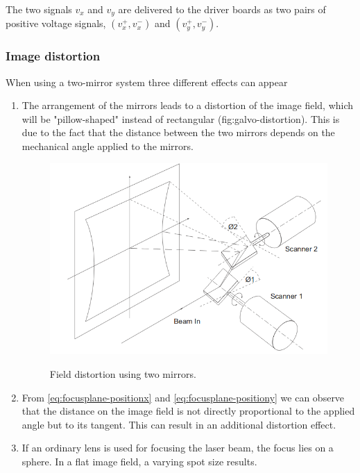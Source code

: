 The two signals $v_x$ and $v_y$ are delivered to the driver boards as two pairs of positive voltage signals, $(v_x^+, v_x^-)$ and $(v_y^+, v_y^-)$. 


\subsubsection{Image distortion}
When using a two-mirror system three different effects can appear
\begin{enumerate}
	\item The arrangement of the mirrors leads to a distortion of the image field, which will be "pillow-shaped" instead of rectangular (fig:galvo-distortion). This is due to the fact that the distance between the two mirrors depends on the mechanical angle applied to the mirrors. 
	
	
	\begin{figure}[bth]
		\myfloatalign
		{\includegraphics[width=0.75\linewidth]{gfx/ch3/galvo-distortion}}
		\caption{Field distortion using two mirrors.}\label{fig:galvo-distortion}
	\end{figure}
	
	
	\item From \autoref{eq:focusplane-positionx} and \autoref{eq:focusplane-positiony} we can observe that the distance on the image field is not directly proportional to the applied angle but to its tangent. This can result in an additional distortion effect. 
	
	\item If an ordinary lens is used for focusing the laser beam, the focus lies on a sphere.
	In a flat image field, a varying spot size results. 
\end{enumerate}


